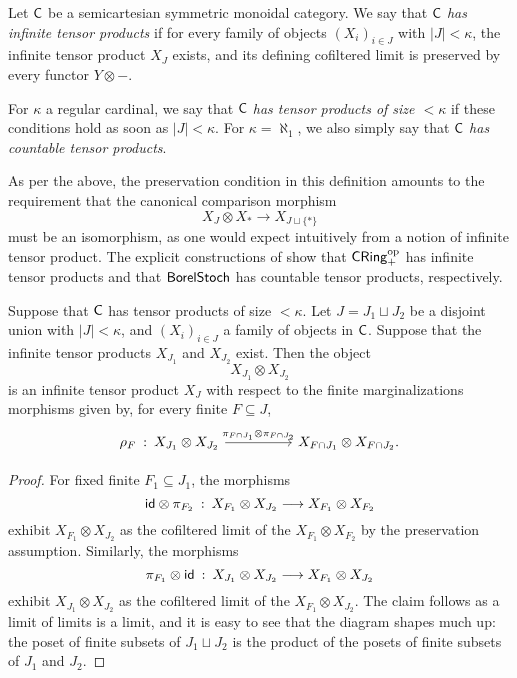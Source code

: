 \documentclass[11pt]{article}
\begin{document}
\begin{definition}
	\label{has_infprods}
	Let $\mathsf{C}$ be a semicartesian symmetric monoidal category. We say that $\mathsf{C}$ \emph{has infinite tensor products} if for every family of objects $(X_i)_{i \in J}$ with $|J| < \kappa$, the infinite tensor product $X_J$ exists, and its defining cofiltered limit is preserved by every functor $Y \otimes -$.

	For $\kappa$ a regular cardinal, we say that $\mathsf{C}$ \emph{has tensor products of size $<\kappa$} if these conditions hold as soon as $|J| < \kappa$. For $\kappa = \aleph_1$, we also simply say that $\mathsf{C}$ \emph{has countable tensor products}.
\end{definition}


As per the above, the preservation condition in this definition amounts to the requirement that the canonical comparison morphism
\[
	X_J \otimes X_\ast \longrightarrow X_{J \sqcup \{\ast\}}
\]
must be an isomorphism, as one would expect intuitively from a notion of infinite tensor product. The explicit constructions of  show that $\operatorname{\mathsf{CRing}}_+^{\mathrm{op}}$ has infinite tensor products and that $\operatorname{\mathsf{BorelStoch}}$ has countable tensor products, respectively.

\begin{lemma}
	\label{two_infproducts}
	Suppose that $\mathsf{C}$ has tensor products of size $< \kappa$. Let $J = J_1 \sqcup J_2$ be a disjoint union with $|J| < \kappa$, and $(X_i)_{i \in J}$ a family of objects in $\mathsf{C}$. Suppose that the infinite tensor products $X_{J_1}$ and $X_{J_2}$ exist. Then the object
	\[
		X_{J_1} \otimes X_{J_2} 
	\]
	is an infinite tensor product $X_J$ with respect to the finite marginalizations morphisms given by, for every finite $F \subseteq J$,
	\[
		\begin{tikzcd}[column sep=huge]
			\rho_F \: : \: X_{J_1} \otimes X_{J_2} \ar{r}{\pi_{F\cap J_1} \otimes \pi_{F\cap J_2}} & X_{F \cap J_1} \otimes X_{F \cap J_2}.
		\end{tikzcd}
	\]
\end{lemma}
\begin{proof}
	For fixed finite $F_1 \subseteq J_1$, the morphisms
	\[
		\mathsf{id} \otimes \pi_{F_2} \: : \: X_{F_1} \otimes X_{J_2} \longrightarrow X_{F_1} \otimes X_{F_2}
	\]
	exhibit $X_{F_1} \otimes X_{J_2}$ as the cofiltered limit of the $X_{F_1} \otimes X_{F_2}$ by the preservation assumption. Similarly, the morphisms
	\[
		\pi_{F_1} \otimes \mathsf{id} \: : \: X_{J_1} \otimes X_{J_2} \longrightarrow X_{F_1} \otimes X_{J_2}
	\]
	exhibit $X_{J_1} \otimes X_{J_2}$ as the cofiltered limit of the $X_{F_1} \otimes X_{J_2}$. The claim follows as a limit of limits is a limit, and it is easy to see that the diagram shapes much up: the poset of finite subsets of $J_1 \sqcup J_2$ is the product of the posets of finite subsets of $J_1$ and $J_2$.
\end{proof}
\end{document}
